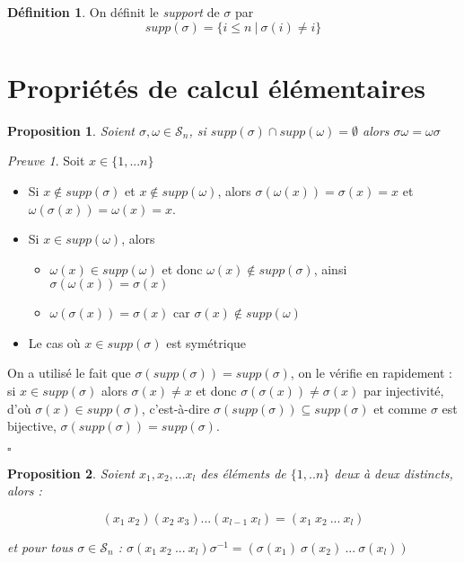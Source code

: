\documentclass[]{article}
\newtheorem{myproposition}{Proposition}
\theoremstyle{remark}
\newtheorem{myproof}{Preuve}
\theoremstyle{definition}
\newtheorem{mydef}{Définition}
\newcommand{\cqfd}{
	\hfill$\square$
}
\begin{document}
\begin{mydef}
	On définit le \textit{support} de $\sigma$ par
	$$supp(\sigma) = \{i \leqslant n ~ | ~ \sigma(i) \neq i\}$$
\end{mydef}

\section{Propriétés de calcul élémentaires}

\begin{myproposition}
	Soient $\sigma, \omega \in \mathscr{S}_n$, si $supp(\sigma) \cap supp(\omega) = \emptyset$ alors $\sigma \omega = \omega \sigma$
\end{myproposition}

\begin{myproof}
	Soit $x \in \{1, ... n\}$
	\begin{itemize}
		\item Si $x \notin supp(\sigma)$ et $x \notin supp(\omega)$, alors $\sigma(\omega(x))=\sigma(x)=x$ et $\omega(\sigma(x))=\omega(x)=x$.
		\item Si $x \in supp(\omega)$, alors 
			\begin{itemize}
				\item $\omega(x) \in supp(\omega)$ et donc $\omega(x) \notin supp(\sigma)$, ainsi $\sigma(\omega(x))=\sigma(x)$
				\item $\omega(\sigma(x))=\sigma(x)$ car $\sigma(x) \notin supp(\omega)$
			\end{itemize}
		\item Le cas où $x \in supp(\sigma)$ est symétrique
	\end{itemize}
	
	On a utilisé le fait que $\sigma(supp(\sigma)) = supp(\sigma)$, on le vérifie en rapidement : si $x \in supp(\sigma)$ alors $\sigma(x) \neq x$ et donc $\sigma(\sigma(x)) \neq \sigma(x)$ par injectivité, d'où $\sigma(x) \in supp(\sigma)$, c'est-à-dire $\sigma(supp(\sigma)) \subseteq supp(\sigma)$ et comme $\sigma$ est bijective, $\sigma(supp(\sigma)) = supp(\sigma)$.
	
	\cqfd
\end{myproof}

\begin{myproposition}
	Soient $x_1, x_2, ... x_l$ des éléments de $\{1, ..n\}$ deux à deux distincts, alors :
	
	$$(x_1 ~ x_2)(x_2 ~ x_3) ... (x_{l-1} ~ x_l) = (x_1 ~ x_2~ ...~ x_l)$$
	
	et pour tous $\sigma \in \mathscr{S}_n$ : $\sigma (x_1 ~x_2 ~...~ x_l) \sigma^{-1} = (\sigma(x_1) ~ \sigma(x_2)~ ... ~\sigma(x_l))$
\end{myproposition}
\end{document}
